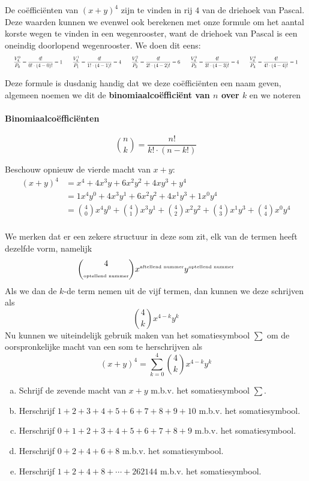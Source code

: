 \documentclass[12pt,a4,twoside]{article}
\begin{document}
De coëfficiënten van $(x+y)^4$ zijn te vinden in rij $4$ van de driehoek van Pascal. Deze waarden kunnen we evenwel ook berekenen met onze formule om het aantal korste wegen te vinden in een wegenrooster, want de driehoek van Pascal is een oneindig doorlopend wegenrooster. We doen dit eens:
\newcommand\calcC[2]{
  \dfrac{#2!}{#1! \cdot (#2-#1)!}
}
\[\scalebox{0.6}{$\dfrac{V^0_4}{P_0}=\calcC{0}{4} = 1 \qquad \dfrac{V^1_4}{P_1}=\calcC{1}{4} = 4 \qquad \dfrac{V^2_4}{P_2}=\calcC{2}{4} = 6 \qquad \dfrac{V^3_4}{P_3}=\calcC{3}{4} = 4 \qquad \dfrac{V^4_4}{P_4}=\calcC{4}{4} = 1$}\]

Deze formule is dusdanig handig dat we deze coëfficiënten een naam geven, algemeen noemen we dit de {\bf binomiaalcoëfficiënt van $n$ over $k$} en we noteren

\paragraph*{Binomiaalcoëfficiënten}
\begin{mdframed}
\[{n \choose k} = \dfrac{n!}{k!\cdot\left(n-k!\right)}\]
\end{mdframed}

Beschouw opnieuw de vierde macht van $x+y$:
\begin{align*}
  (x+y)^4 &= x^4 + 4x^3y+6x^2y^2+4xy^3+y^4\\
          &= 1x^4y^0 + 4x^3y^1+6x^2y^2+4x^1y^3+1x^0y^4\\
          &= {4 \choose 0}x^4y^0 + {4 \choose 1}x^3y^1+{4 \choose 2}x^2y^2+{4 \choose 3}x^1y^3+{4 \choose 4}x^0y^4\\
\end{align*}

We merken dat er een zekere structuur in deze som zit, elk van de termen heeft dezelfde vorm, namelijk
\[{4 \choose \mbox{\tiny{optellend nummer}}}x^{\mbox{{\tiny aftellend nummer}}}y^{\mbox{{\tiny optellend nummer}}}\]
Als we dan de $k$-de term nemen uit de vijf termen, dan kunnen we deze schrijven als
\[{4 \choose k}x^{4-k}y^{k}\]
Nu kunnen we uiteindelijk gebruik maken van het somatiesymbool $\sum$ om de oorspronkelijke macht van een som te herschrijven als
\[\left(x+y\right)^4 = \sum^4_{k=0}{4 \choose k}x^{4-k}y^{k}\]

\begin{oefening}
\begin{enumerate}[(a)]
\item Schrijf de zevende macht van $x+y$ m.b.v. het somatiesymbool
  $\sum$.
\item Herschrijf $1 + 2 + 3 + 4 + 5 + 6 + 7 + 8 + 9 + 10$ m.b.v. het somatiesymbool.
\item Herschrijf $0 + 1 + 2 + 3 + 4 + 5 + 6 + 7 + 8 + 9$ m.b.v. het somatiesymbool.
\item Herschrijf $0 + 2 + 4 + 6 + 8$ m.b.v. het somatiesymbool.
\item Herschrijf $1 + 2 + 4 + 8 + \cdots + 262144$ m.b.v. het somatiesymbool.
\end{enumerate}
\end{oefening}
\end{document}
